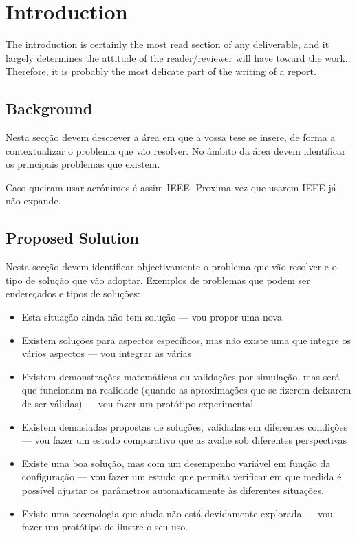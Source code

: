 \chapter{Introduction}
\label{chapter:introduction}
The introduction is certainly the most read section of any deliverable, and it largely determines the attitude of the reader/reviewer will have toward the work. Therefore, it is probably the most delicate part of the writing of a report.

\section{Background}
\label{section:background}
Nesta secção devem descrever a área em que a vossa tese se insere, de forma
a contextualizar o problema que vão resolver. No âmbito da área devem
identificar os principais problemas que existem.

Caso queiram usar acrónimos é assim \ac{IEEE}.
Proxima vez que usarem \ac{IEEE} já não expande.

\section{Proposed Solution}
\label{section:proposed}
Nesta secção devem identificar objectivamente o problema que vão resolver e o
tipo de solução que vão adoptar.
Exemplos de problemas que podem ser endereçados e tipos de soluções:

\begin{itemize}
\item Esta situação ainda não tem solução --- vou propor uma nova
\item Existem soluções para aspectos específicos, mas não existe uma que integre
os vários aspectos --- vou integrar as várias
\item Existem demonstrações matemáticas ou validações por simulação, mas
será que funcionam na realidade (quando as aproximações que se fizerem
deixarem de ser válidas) --- vou fazer um protótipo experimental
\item Existem demasiadas propostas de soluções, validadas em diferentes
condições --- vou fazer um estudo comparativo que as avalie sob diferentes
perspectivas
\item Existe uma boa solução, mas com um desempenho variável em função da
configuração --- vou fazer um estudo que permita verificar em que medida é
possível ajustar os parâmetros automaticamente às diferentes situações.
\item Existe uma teccnologia que ainda não está devidamente explorada --- vou
fazer um protótipo de ilustre o seu uso.
\end{itemize}

